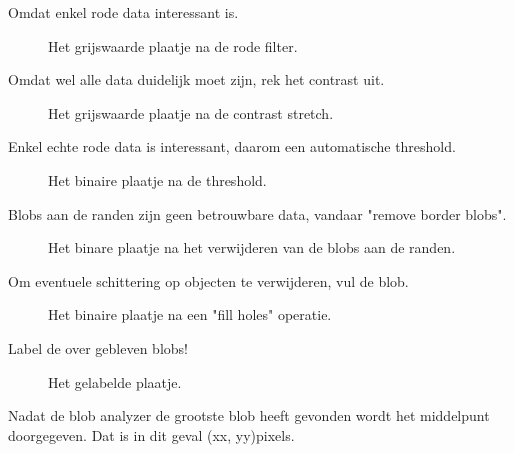 Omdat enkel rode data interessant is.
\begin{figure}
    \begin{center}
    \end{center}
    \caption{Het grijswaarde plaatje na de rode filter.}
    \label{fig:redFilter}
\end{figure}

Omdat wel alle data duidelijk moet zijn, rek het contrast uit.
\begin{figure}
    \begin{center}
    \end{center}
    \caption{Het grijswaarde plaatje na de contrast stretch.}
    \label{fig:contastStretch}
\end{figure}

Enkel echte rode data is interessant, daarom een automatische threshold.
\begin{figure}
    \begin{center}
    \end{center}
    \caption{Het binaire plaatje na de threshold.}
    \label{fig:threshold}
\end{figure}

Blobs aan de randen zijn geen betrouwbare data, vandaar "remove border blobs".
\begin{figure}
    \begin{center}
    \end{center}
    \caption{Het binare plaatje na het verwijderen van de blobs aan de randen.}
    \label{fig:removeBorderBlobs}
\end{figure}

Om eventuele schittering op objecten te verwijderen, vul de blob.
\begin{figure}
    \begin{center}
    \end{center}
    \caption{Het binaire plaatje na een "fill holes" operatie.}
    \label{fig:fillHoles}
\end{figure}

Label de over gebleven blobs!
\begin{figure}
    \begin{center}
    \end{center}
    \caption{Het gelabelde plaatje.}
    \label{fig:labelBlobs}
\end{figure}

Nadat de blob analyzer de grootste blob heeft gevonden wordt het middelpunt doorgegeven.
Dat is in dit geval (xx, yy)pixels.
